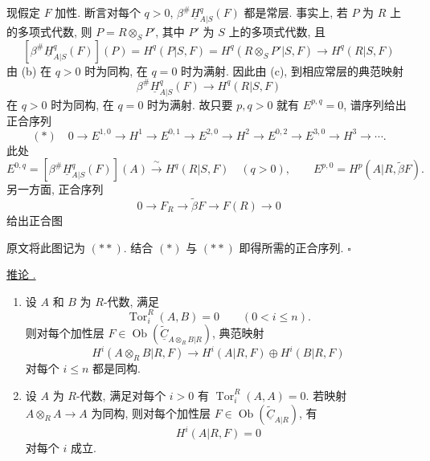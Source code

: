 现假定 $F$ 加性.
断言对每个 $q>0$, $\beta^{\#}\underline H^q_{A|S}(F)$ 都是常层.
事实上, 若 $P$ 为 $R$ 上的多项式代数,
则 $P=R\otimes_SP'$, 其中 $P'$ 为 $S$ 上的多项式代数, 且
\[
 [\beta^{\#}\underline H^q_{A|S}(F)](P)
 =H^q(P|S,F)
 =H^q(R\otimes_SP'|S,F)
 \longrightarrow H^q(R|S,F)
\]
由 (b) 在 $q>0$ 时为同构, 在 $q=0$ 时为满射.
因此由 (c), 到相应常层的典范映射
\[
 \beta^{\#}\underline H^q_{A|S}(F)
 \longrightarrow H^q(R|S,F)
\]
在 $q>0$ 时为同构, 在 $q=0$ 时为满射.
故只要 $p,q>0$ 就有 $E^{p,q}=0$, 谱序列给出正合序列
\[
 (*)\quad
 0\longrightarrow E^{1,0}\longrightarrow H^1
 \longrightarrow E^{0,1}\longrightarrow E^{2,0}
 \longrightarrow H^2\longrightarrow E^{0,2}
 \longrightarrow E^{3,0}\longrightarrow H^3\longrightarrow\cdots.
\]
此处
\[
 E^{0,q}=[\beta^{\#}\underline H^q_{A|S}(F)](A)
 \xrightarrow{\ \sim\ }H^q(R|S,F)\quad(q>0),
 \qquad
 E^{p,0}=H^p(A|R,\widetilde\beta F).
\]
另一方面, 正合序列
\[
 0\longrightarrow F_R\longrightarrow\widetilde\beta F
 \longrightarrow F(R)\longrightarrow0
\]
给出正合图
\begin{center}
\scriptsize
{}
\end{center}
原文将此图记为 $(**)$. 结合 $(*)$ 与 $(**)$ 即得所需的正合序列. \hfill$\square$



\underline{推论 .}

\begin{enumerate}[label=(\alph*)]
\item 设 $A$ 和 $B$ 为 $R$-代数, 满足
\[
 \operatorname{Tor}_i^R(A,B)=0\qquad(0<i\leq n).
\]
则对每个加性层
$F\in\operatorname{Ob}(\widetilde{\underline C}_{A\otimes_RB|R})$, 典范映射
\[
 H^i(A\otimes_RB|R,F)
 \longrightarrow H^i(A|R,F)\oplus H^i(B|R,F)
\]
对每个 $i\leq n$ 都是同构.

\item 设 $A$ 为 $R$-代数, 满足对每个 $i>0$ 有
$\operatorname{Tor}_i^R(A,A)=0$.
若映射 $A\otimes_RA\longrightarrow A$ 为同构,
则对每个加性层 $F\in\operatorname{Ob}(\widetilde{\underline C}_{A|R})$, 有
\[
 H^i(A|R,F)=0
\]
对每个 $i$ 成立.
\end{enumerate}


